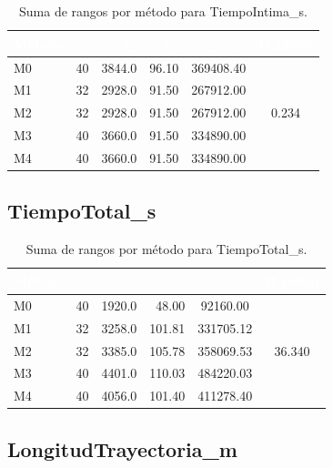 \documentclass[12pt,a4paper,oneside]{book}
\begin{document}
\begin{table}[H]
\centering
\small
\caption{Suma de rangos por método para TiempoIntima\_s.}
\begin{tabular}{lcrrcc}
\toprule
\rowcolor{primary}
\textcolor{white}{\textbf{Método}} & \textcolor{white}{$n_j$} & \textcolor{white}{$R_j$} & \textcolor{white}{$\bar{R}_j$} & \textcolor{white}{$R_j^2/n_j$} & \textcolor{white}{H global} \\
\midrule
M0 & 40 & 3844.0 & 96.10 & 369408.40 & \multirow{5}{*}{0.234} \\
M1 & 32 & 2928.0 & 91.50 & 267912.00 & \\
M2 & 32 & 2928.0 & 91.50 & 267912.00 & \\
M3 & 40 & 3660.0 & 91.50 & 334890.00 & \\
M4 & 40 & 3660.0 & 91.50 & 334890.00 & \\
\bottomrule
\end{tabular}
\end{table}

\subsection{TiempoTotal\_s}

\begin{table}[H]
\centering
\small
\caption{Suma de rangos por método para TiempoTotal\_s.}
\begin{tabular}{lcrrcc}
\toprule
\rowcolor{primary}
\textcolor{white}{\textbf{Método}} & \textcolor{white}{$n_j$} & \textcolor{white}{$R_j$} & \textcolor{white}{$\bar{R}_j$} & \textcolor{white}{$R_j^2/n_j$} & \textcolor{white}{H global} \\
\midrule
M0 & 40 & 1920.0 & 48.00 & 92160.00 & \multirow{5}{*}{36.340} \\
M1 & 32 & 3258.0 & 101.81 & 331705.12 & \\
M2 & 32 & 3385.0 & 105.78 & 358069.53 & \\
M3 & 40 & 4401.0 & 110.03 & 484220.03 & \\
M4 & 40 & 4056.0 & 101.40 & 411278.40 & \\
\bottomrule
\end{tabular}
\end{table}

\subsection{LongitudTrayectoria\_m}
\end{document}
